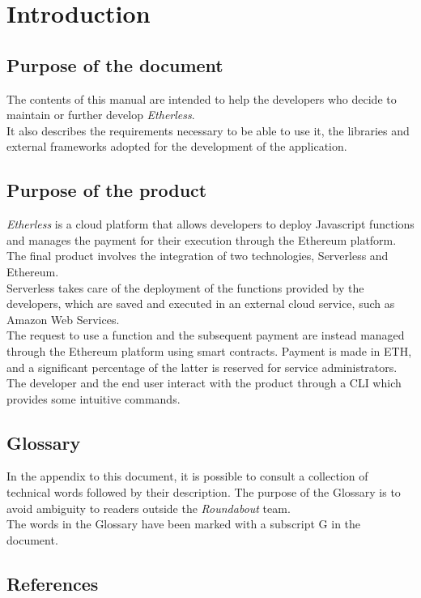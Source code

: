 \section{Introduction}

	\subsection{Purpose of the document}
	The contents of this manual are intended to help the developers who decide to maintain or further develop \textit{Etherless}. \\
	It also describes the requirements necessary to be able to use it, the libraries and external frameworks adopted for the development of the application.
	
	
	\subsection{Purpose of the product}
	\textit{Etherless} is a cloud platform that allows developers to deploy Javascript functions and manages the payment for their execution through the Ethereum platform.
	The final product involves the integration of two technologies, Serverless and Ethereum.\\
	Serverless takes care of the deployment of the functions provided by the developers, which are saved and executed in an external cloud service, such as Amazon Web Services.\\
	The request to use a function and the subsequent payment are instead managed through the Ethereum platform using smart contracts. Payment is made in ETH, and a significant percentage of the latter is reserved for service administrators.\\
	The developer and the end user interact with the product through a CLI which provides some intuitive commands.

	
	\subsection{Glossary}
	In the appendix to this document, it is possible to consult a collection of technical words followed by their description. The purpose of the Glossary is to avoid ambiguity to readers outside the \textit{Roundabout} team.\\
	The words in the Glossary have been marked with a subscript G in the document.
	
	
	\subsection{References}
	
